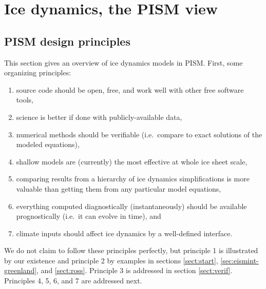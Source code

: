 \documentclass[titlepage,letterpaper,final]{scrartcl}
\begin{document}
\vspace{.4in}

\large
\begin{center}
\normalsize
\end{center}
\normalsize


\clearpage\newpage



\clearpage
\newpage
\section{Ice dynamics, the PISM view}\label{sect:dynamics}

\subsection{PISM design principles}  This section gives an overview of ice dynamics models in PISM.  First, some organizing principles:
\begin{enumerate}
\item source code should be open, free, and work well with other free software tools,
\item science is better if done with publicly-available data,
\item numerical methods should be verifiable (i.e.~compare to exact solutions of the modeled equations),
\item shallow models are (currently) the most effective at whole ice sheet scale,
\item comparing results from a hierarchy of ice dynamics simplifications is more valuable than getting them from any particular model equations,
\item everything computed diagnostically (instantaneously) should be available prognostically (i.e.~it can evolve in time), and
\item climate inputs should affect ice dynamics by a well-defined interface.
\end{enumerate}

\noindent We do not claim to follow these principles perfectly, but principle 1 is illustrated by our existence and principle 2 by examples in sections \ref{sect:start}, \ref{sec:eismint-greenland}, and \ref{sect:ross}.  Principle 3 is addressed in section \ref{sect:verif}.  Principles 4, 5, 6, and 7 are addressed next.
\end{document}
